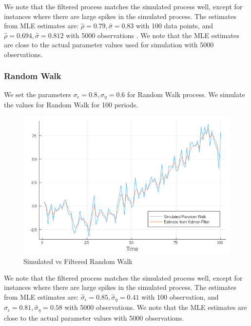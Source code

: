 \documentclass[12pt]{article}
\begin{document}
We note that the filtered process matches the simulated process well, except for instances where there are large spikes in the simulated process. The estimates from MLE estimates are: $\hat{\rho} = 0.79, \hat{\sigma} =0.83$ with 100 data points, and $\hat{\rho} = 0.694, \hat{\sigma} =0.812$ with 5000 observations . We note that the MLE estimates are close to the actual parameter values used for simulation with 5000 observations.

\subsubsection{Random Walk}
We set the parameters $\sigma_{\epsilon} = 0.8, \sigma_{\eta}= 0.6$ for Random Walk process. We simulate the values for Random Walk for 100 periods.
\begin{figure}[h]
\centering
\includegraphics[scale=0.4]{RW.png}
\caption{Simulated vs Filtered Random Walk}
\end{figure}

We note that the filtered process matches the simulated process well, except for instances where there are large spikes in the simulated process. The estimates from MLE estimates are: $\hat{\sigma}_{\epsilon} = 0.85, \hat{\sigma}_{\eta}= 0.41$ with 100 observation, and $\hat{\sigma}_{\epsilon} = 0.81, \hat{\sigma}_{\eta}= 0.58$ with 5000 observations.  We note that the MLE estimates are close to the actual parameter values with 5000 observations.
%
\end{document}
